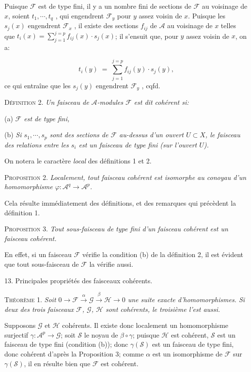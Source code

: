 Puisque $\mathcal{F}$ est de type fini, il y a un nombre fini de sections de $\mathcal{F}$ au voisinage de $x$, soient $t_1 , \cdots , t_q$ , qui engendrent $\mathcal{F}_y$ pour $y$ assez voisin de $x$. Puisque les $s_j(x)$ engendrent $\mathcal{F}_x$ , il existe des sections $f_{ij}$ de $\mathcal{A}$ au voisinage de $x$ telles que $t_i(x) = \sum_{j=1}^{j=p} f_{ij}(x) \cdot s_j(x)$; il s'ensuit que, pour $y$ assez voisin de $x$, on a:

\begin{equation*}
t_i(y) \;=\; \sum_{j=1}^{j=p} f_{ij}(y) \cdot s_j(y),
\end{equation*}
ce qui entraîne que les $s_j(y)$ engendrent $\mathcal{F}_y$ , cqfd.



\textsc{Définition} 2. \textit{Un faisceau de $\mathcal{A}$-modules $\mathcal{F}$ est dit cohérent si:}

(a) \textit{$\mathcal{F}$ est de type fini,}

(b) \textit{Si $s_1 , \cdots , s_p$ sont des sections de $\mathcal{F}$ au-dessus d'un ouvert $U \subset X$, le faisceau des relations entre les $s_i$ est un faisceau de type fini (sur l'ouvert $U$).}

On notera le caractère \textit{local} des définitions 1 et 2.

\textsc{Proposition} 2. \textit{Localement, tout faisceau cohérent est isomorphe au conoyau d'un homomorphisme $\varphi : \mathcal{A}^q \to \mathcal{A}^p$.}

Cela résulte immédiatement des définitions, et des remarques qui précèdent la définition 1.

\textsc{Proposition} 3. \textit{Tout sous-faisceau de type fini d'un faisceau cohérent est un faisceau cohérent.}

En effet, si un faisceau $\mathcal{F}$ vérifie la condition (b) de la définition 2, il est évident que tout sous-faisceau de $\mathcal{F}$ la vérifie aussi.


13. Principales propriétés des faisceaux cohérents.

\textsc{Théorème} 1. \textit{Soit $0 \to \mathcal{F} \xrightarrow{\alpha} \mathcal{G} \xrightarrow{\beta} \mathcal{H} \to 0$ une suite exacte d'homomorphismes. Si deux des trois faisceaux $\mathcal{F}$, $\mathcal{G}$, $\mathcal{H}$ sont cohérents, le troisième l'est aussi.}

Supposons $\mathcal{G}$ et $\mathcal{H}$ cohérents. Il existe donc localement un homomorphisme surjectif $\gamma : \mathcal{A}^p \to \mathcal{G}$; soit $\mathcal{S}$ le noyau de $\beta \circ \gamma$; puisque $\mathcal{H}$ est cohérent, $\mathcal{S}$ est un faisceau de type fini (condition (b)); donc $\gamma(\mathcal{S})$ est un faisceau de type fini, donc cohérent d'après la Proposition 3; comme $\alpha$ est un isomorphisme de $\mathcal{F}$ sur $\gamma(\mathcal{S})$, il en résulte bien que $\mathcal{F}$ est cohérent.

